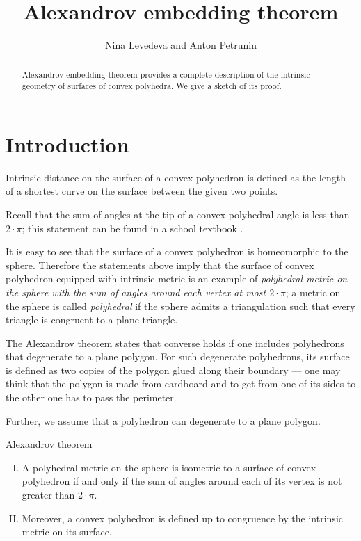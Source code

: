 \documentclass[oneside,a4paper]{article}
\begin{document}
\pagestyle{empty}\renewcommand\includegraphics[2][{}]{}

\title{Alexandrov embedding theorem}
\author{Nina Levedeva and Anton Petrunin}
\date{}
\maketitle

\begin{abstract}
Alexandrov embedding theorem provides a complete description of the intrinsic geometry of surfaces of convex polyhedra.
We give a sketch of its proof.
\end{abstract}

\section{Introduction}

Intrinsic distance on the surface of a convex polyhedron is defined as the length of a shortest curve on the surface between the given two points.

Recall that the sum of angles at the tip of a convex polyhedral angle is less than $2\cdot\pi$;
this statement can be found in a school textbook \cite[§~48]{kiselyov-3D}.

It is easy to see that the surface of a convex polyhedron is homeomorphic to the sphere.
Therefore the statements above imply that the surface of convex polyhedron equipped with intrinsic metric is an example of \emph{polyhedral metric on the sphere with the sum of angles around each vertex at most $2\cdot\pi$};
a metric on the sphere is called \emph{polyhedral} if the sphere admits a triangulation such that every triangle is congruent to a plane triangle.

The Alexandrov theorem states that converse holds if one includes polyhedrons that degenerate to a plane polygon.
For such degenerate polyhedrons, its surface is defined as two copies of the polygon glued along their boundary --- one may think that the polygon is made from cardboard and to get from one of its sides to the other one has to pass the perimeter.

Further, we assume that a polyhedron can degenerate to a plane polygon.

\begin{thm}{Alexandrov theorem}
\begin{enumerate}[I.]
\item\label{thm:exist}
A polyhedral metric on the sphere is isometric to a surface of convex polyhedron if and only if the sum of angles around each of its vertex is not greater than $2\cdot\pi$.

\item\label{thm:unique} 
Moreover, a convex polyhedron is defined up to congruence by the intrinsic metric on its surface.
\end{enumerate}

\end{thm}
\end{document}
